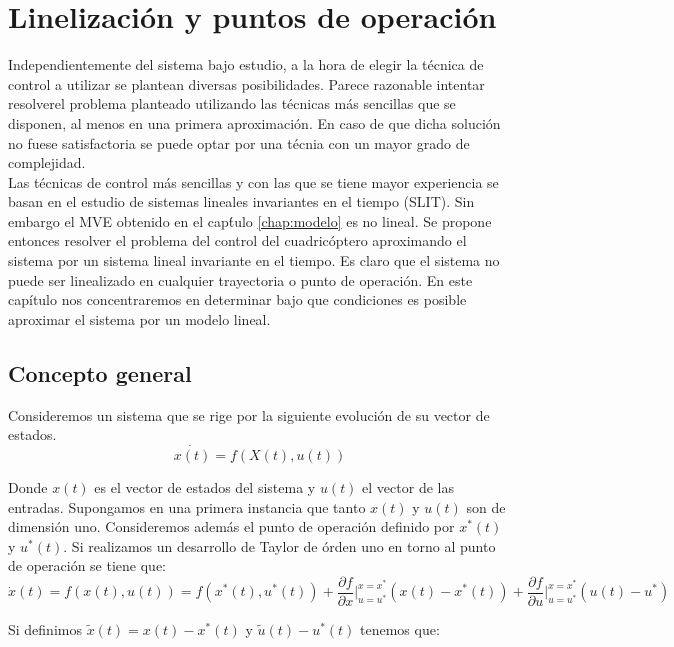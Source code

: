 \documentclass[main]{subfiles}
\begin{document}
\chapter{Linelizaci\'on y puntos de operaci\'on}
\label{chap:linealizacion}

Independientemente del sistema bajo estudio, a la hora de elegir la t\'ecnica de control a utilizar se plantean diversas posibilidades. Parece razonable intentar resolverel problema planteado utilizando las t\'ecnicas m\'as sencillas que se disponen, al menos en una primera aproximaci\'on. En caso de que dicha soluci\'on no fuese satisfactoria se puede optar por una t\'ecnia con un mayor grado de complejidad.\\ 

Las t\'ecnicas de control m\'as sencillas y con las que se tiene mayor experiencia se basan en el estudio de sistemas lineales invariantes en el tiempo (SLIT). Sin embargo el MVE obtenido en el cap\'tulo \ref{chap:modelo} es no lineal. Se propone entonces resolver el problema del control del cuadric\'optero aproximando el sistema por un sistema lineal invariante en el tiempo. Es claro que el sistema no puede ser linealizado en cualquier trayectoria o punto de operaci\'on. En  este cap\'itulo nos concentraremos en determinar bajo que condiciones es posible aproximar el sistema por un modelo lineal.

\section{Concepto general}
Consideremos un sistema que se rige por la siguiente evoluci\'on de su vector de estados. 
\begin{equation}
\dot{x(t)}=f(X(t),u(t))
\end{equation}

Donde $x(t)$ es el vector de estados del sistema y $u(t)$ el vector de las entradas. Supongamos en una primera instancia que tanto $x(t)$ y $u(t)$ son de dimensi\'on uno. Consideremos adem\'as el punto de operaci\'on definido por $x^*(t)$ y $u^*(t)$. Si realizamos un desarrollo de Taylor de \'orden uno en torno al punto de operaci\'on se tiene que:
\begin{equation}
\dot{x}(t)=f(x(t),u(t))=f(x^*(t),u^*(t))+\frac{\partial f}{\partial x}\vert_{u=u^*}^{x=x^*}(x(t)-x^*(t))+\frac{\partial f}{\partial u}\vert_{u=u^*}^{x=x^*}(u(t)-u^*)
\end{equation}

Si definimos $\tilde{x}(t)=x(t)-x^*(t)$ y $\tilde{u}(t)-u^*(t)$ tenemos que:
\end{document}
